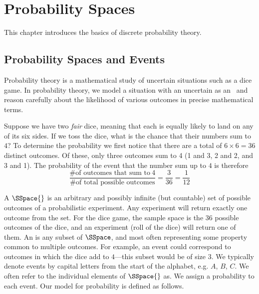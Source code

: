 \chapter{Probability Spaces}
\label{ch:probability::spaces}


\begin{preamble}
This chapter introduces the basics of discrete probability theory.
\end{preamble}

\section{Probability Spaces and Events}
\label{sec:probability::spaces::spaces}

\begin{gram}
Probability theory is a mathematical study of uncertain situations
such as a dice game.
%
In probability theory, we model a situation with an uncertain  as an~ and reason carefully about the likelihood of various outcomes in precise mathematical terms. 
%
\end{gram}

\begin{example}
Suppose we have two \emph{fair} dice, meaning that each is equally
likely to land on any of its six sides.  If we toss the dice, what is
the chance that their numbers sum to $4$?  
%
To determine the probability we first notice that there are a total of 
$6 \times 6 = 36$ distinct outcomes.
%
Of these, only three outcomes sum to 4 (1 and 3, 2 and 2,
and 3 and 1).
%
The probability of the event that the number sum up to $4$ is therefore
\begin{equation*}
\frac
{\text{\# of outcomes that sum to}~4}
{\text{\# of total possible outcomes}} 
= 
\frac{3}{36} = \frac{1}{12}
\end{equation*}

\end{example}
%


\begin{gram}
A  $\SSpace{}$ is an arbitrary and possibly infinite
(but countable) set of possible outcomes of a probabilistic
experiment.   Any experiment will return exactly one outcome from the set.
%
For the dice game, the sample space is the 36 possible outcomes of the
dice, and an experiment (roll of the dice) will return one of them.  
%
An  is any subset of $\SSpace$, and
most often representing some property common to multiple outcomes.  
%
For example, an event could correspond to outcomes in which the dice
add to $4$---this subset would be of size $3$.
%
We typically denote events by capital letters from the start
of the alphabet, e.g. $A$, $B$, $C$.
%
We often refer to the individual elements of $\SSpace{}$ as.
%
We assign a probability to each event.
%
Our model for probability is defined as follows.
\end{gram}

